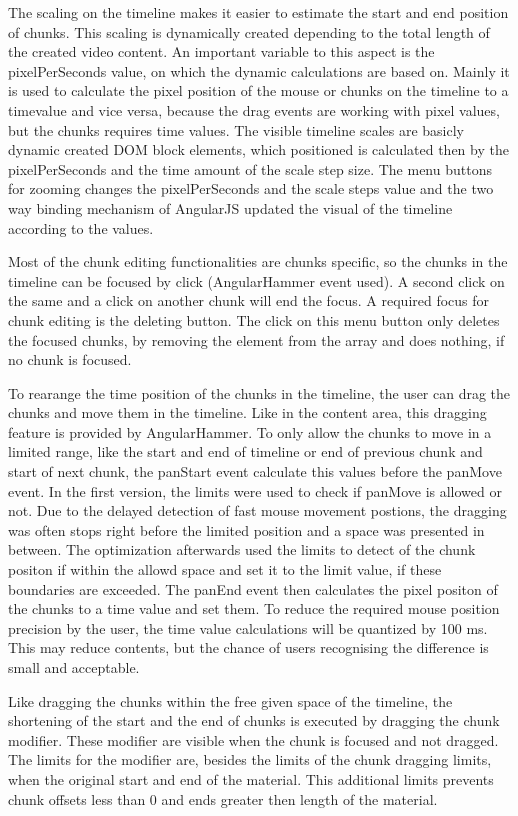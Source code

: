 \documentclass[conference]{IEEEtran}
\begin{document}
The scaling on the timeline makes it easier to estimate the start and end position of chunks. This scaling is dynamically created depending to the total length of the created video content. An important variable to this aspect is the pixelPerSeconds value, on which the dynamic calculations are based on. Mainly it is used to calculate the pixel position of the mouse or chunks on the timeline to a timevalue and vice versa, because the drag events are working with pixel values, but the chunks requires time values. The visible timeline scales are basicly dynamic created DOM block elements, which positioned is calculated then by the pixelPerSeconds and the time amount of the scale step size. The menu buttons for zooming changes the pixelPerSeconds and the scale steps value and the two way binding mechanism of AngularJS updated the visual of the timeline according to the values.

Most of the chunk editing functionalities are chunks specific, so the chunks in the timeline can be focused by click (AngularHammer event used). A second click on the same and a click on another chunk will end the focus. A required focus for chunk editing is the deleting button. The click on this menu button only deletes the focused chunks, by removing the element from the array and does nothing, if no chunk is focused.

To rearange the time position of the chunks in the timeline, the user can drag the chunks and move them in the timeline. Like in the content area, this dragging feature is provided by AngularHammer. To only allow the chunks to move in a limited range, like the start and end of timeline or end of previous chunk and start of next chunk, the panStart event calculate this values before the panMove event. In the first version, the limits were used to check if panMove is allowed or not. Due to the delayed detection of fast mouse movement postions, the dragging was often stops right before the limited position and a space was presented in between. The optimization afterwards used the limits to detect of the chunk positon if within the allowd space and set it to the limit value, if these boundaries are exceeded. The panEnd event then calculates the pixel positon of the chunks to a time value and set them. To reduce the required mouse position precision by the user, the time value calculations will be quantized by 100 ms. This may reduce contents, but the chance of users recognising the difference is small and acceptable.

Like dragging the chunks within the free given space of the timeline, the shortening of the start and the end of chunks is executed by dragging the chunk modifier. These modifier are visible when the chunk is focused and not dragged. The limits for the modifier are, besides the limits of the chunk dragging limits, when the original start and end of the material. This additional limits prevents chunk offsets less than 0 and ends greater then length of the material. 
\end{document}
